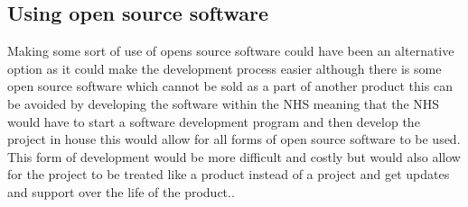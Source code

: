 \documentclass[a4paper,12pt]{scrartcl}
\begin{document}
{		\subsection{Using open source software}
		{
			Making some sort of use of opens source software could have been an alternative option as it could make the development process easier although there is some open source software which cannot be sold as a part of another product this can be avoided by developing the software within the NHS meaning that the NHS would have to start a software development program and then develop the project in house this would allow for all forms of open source software to be used. This form of development would be more difficult and costly but would also allow for the project to be treated like a product instead of a project and get updates and support over the life of the product.\cite{chelsom2011open}.
		}
	}
\end{document}
